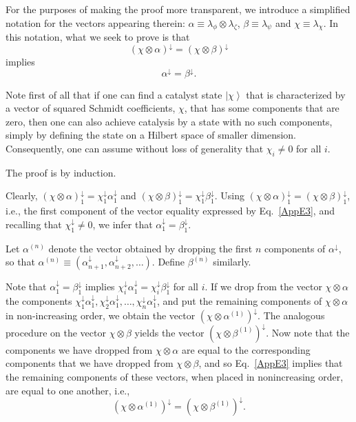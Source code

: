 \documentclass[prx,11pt,letterpaper,twocolumn,accepted=2023-11-27]{quantumarticle}
\newcommand{\ket}[1]{\left| #1 \right>}
\theoremstyle{plain}
\theoremstyle{definition}
\begin{document}
\begin{appendices}
For the purposes of making the proof more transparent, we introduce a simplified notation for the vectors appearing therein: $\alpha \equiv \lambda_{\phi} \otimes \lambda_{\zeta}$,  $\beta \equiv \lambda_{\psi}$ and $\chi \equiv \lambda_{\chi}$.  In this notation, what we seek to prove is that  
\begin{equation}\label{AppE3}
(\chi \otimes \alpha)^{\downarrow} = (\chi \otimes \beta)^{\downarrow}
\end{equation}
 implies 
 \begin{equation}\label{AppE4}
 \alpha^{\downarrow} = \beta^{\downarrow}.
 \end{equation}


Note first of all that if one can find a catalyst state $\ket \chi$ that is characterized by a vector of squared Schmidt coefficients, $\chi$, that has some components that are zero, then one can also achieve catalysis by a state with no such components, simply by defining the state on a Hilbert space of smaller dimension. Consequently, one can assume without loss of generality that $\chi_i \ne 0$ for all $i$. 

The proof is by induction.  

Clearly, $(\chi \otimes \alpha)^{\downarrow}_1 = \chi^{\downarrow}_1 \alpha^{\downarrow}_1$ and $(\chi \otimes \beta)^{\downarrow}_1 = \chi^{\downarrow}_1 \beta^{\downarrow}_1$.  Using  $(\chi \otimes \alpha)^{\downarrow}_1 = (\chi \otimes \beta)^{\downarrow}_1$, i.e., the first component of the vector equality expressed by Eq.~\eqref{AppE3}, 
 and recalling that $\chi^{\downarrow}_1 \ne 0$, we infer that $\alpha^{\downarrow}_1 =\beta^{\downarrow}_1$.  
 

Let  $\alpha^{(n)}$ denote the vector obtained by dropping the first $n$ components of $\alpha^{\downarrow}$, so that $\alpha^{(n)} \equiv (\alpha^{\downarrow}_{n+1},\alpha^{\downarrow}_{n+2},\dots)$.  Define $\beta^{(n)}$ similarly.  

Note that $\alpha^{\downarrow}_1 =\beta^{\downarrow}_1$ implies $ \chi^{\downarrow}_i \alpha^{\downarrow}_1 =  \chi^{\downarrow}_i \beta^{\downarrow}_1$ for all $i$.  If we drop from the vector $\chi \otimes \alpha$ the components $\chi^{\downarrow}_1 \alpha^{\downarrow}_1, \chi^{\downarrow}_2 \alpha^{\downarrow}_1, \dots, \chi^{\downarrow}_n \alpha^{\downarrow}_1 $, and put the remaining components of $\chi \otimes \alpha$ in non-increasing order, we obtain the vector $(\chi \otimes \alpha^{(1)})^{\downarrow}$.  The analogous procedure on the vector $\chi \otimes \beta$ yields the vector $(\chi \otimes \beta^{(1)})^{\downarrow}$.  Now note that the components we have dropped from $\chi \otimes \alpha$ are equal to the corresponding components that we have dropped from $\chi \otimes \beta$, and so Eq.~\eqref{AppE3} implies that the remaining components of these vectors, when placed in nonincreasing order, are equal to one another, i.e.,
\begin{equation}\label{AppE6}
(\chi \otimes \alpha^{(1)})^{\downarrow}= (\chi \otimes \beta^{(1)})^{\downarrow}.
\end{equation}


\end{appendices}
\end{document}
